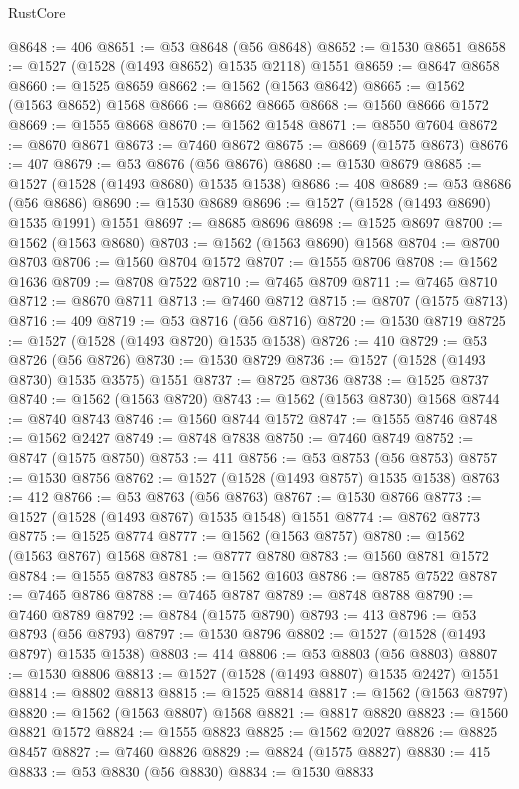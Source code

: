\begin{lexlean}{RustCore}
\begin{coremodule}
@8648 := 406
@8651 := @53 @8648 (@56 @8648)
@8652 := @1530 @8651
@8658 := @1527 (@1528 (@1493 @8652) @1535 @2118) @1551
@8659 := @8647 @8658
@8660 := @1525 @8659
@8662 := @1562 (@1563 @8642)
@8665 := @1562 (@1563 @8652) @1568
@8666 := @8662 @8665
@8668 := @1560 @8666 @1572
@8669 := @1555 @8668
@8670 := @1562 @1548
@8671 := @8550 @7604
@8672 := @8670 @8671
@8673 := @7460 @8672
@8675 := @8669 (@1575 @8673)
@8676 := 407
@8679 := @53 @8676 (@56 @8676)
@8680 := @1530 @8679
@8685 := @1527 (@1528 (@1493 @8680) @1535 @1538)
@8686 := 408
@8689 := @53 @8686 (@56 @8686)
@8690 := @1530 @8689
@8696 := @1527 (@1528 (@1493 @8690) @1535 @1991) @1551
@8697 := @8685 @8696
@8698 := @1525 @8697
@8700 := @1562 (@1563 @8680)
@8703 := @1562 (@1563 @8690) @1568
@8704 := @8700 @8703
@8706 := @1560 @8704 @1572
@8707 := @1555 @8706
@8708 := @1562 @1636
@8709 := @8708 @7522
@8710 := @7465 @8709
@8711 := @7465 @8710
@8712 := @8670 @8711
@8713 := @7460 @8712
@8715 := @8707 (@1575 @8713)
@8716 := 409
@8719 := @53 @8716 (@56 @8716)
@8720 := @1530 @8719
@8725 := @1527 (@1528 (@1493 @8720) @1535 @1538)
@8726 := 410
@8729 := @53 @8726 (@56 @8726)
@8730 := @1530 @8729
@8736 := @1527 (@1528 (@1493 @8730) @1535 @3575) @1551
@8737 := @8725 @8736
@8738 := @1525 @8737
@8740 := @1562 (@1563 @8720)
@8743 := @1562 (@1563 @8730) @1568
@8744 := @8740 @8743
@8746 := @1560 @8744 @1572
@8747 := @1555 @8746
@8748 := @1562 @2427
@8749 := @8748 @7838
@8750 := @7460 @8749
@8752 := @8747 (@1575 @8750)
@8753 := 411
@8756 := @53 @8753 (@56 @8753)
@8757 := @1530 @8756
@8762 := @1527 (@1528 (@1493 @8757) @1535 @1538)
@8763 := 412
@8766 := @53 @8763 (@56 @8763)
@8767 := @1530 @8766
@8773 := @1527 (@1528 (@1493 @8767) @1535 @1548) @1551
@8774 := @8762 @8773
@8775 := @1525 @8774
@8777 := @1562 (@1563 @8757)
@8780 := @1562 (@1563 @8767) @1568
@8781 := @8777 @8780
@8783 := @1560 @8781 @1572
@8784 := @1555 @8783
@8785 := @1562 @1603
@8786 := @8785 @7522
@8787 := @7465 @8786
@8788 := @7465 @8787
@8789 := @8748 @8788
@8790 := @7460 @8789
@8792 := @8784 (@1575 @8790)
@8793 := 413
@8796 := @53 @8793 (@56 @8793)
@8797 := @1530 @8796
@8802 := @1527 (@1528 (@1493 @8797) @1535 @1538)
@8803 := 414
@8806 := @53 @8803 (@56 @8803)
@8807 := @1530 @8806
@8813 := @1527 (@1528 (@1493 @8807) @1535 @2427) @1551
@8814 := @8802 @8813
@8815 := @1525 @8814
@8817 := @1562 (@1563 @8797)
@8820 := @1562 (@1563 @8807) @1568
@8821 := @8817 @8820
@8823 := @1560 @8821 @1572
@8824 := @1555 @8823
@8825 := @1562 @2027
@8826 := @8825 @8457
@8827 := @7460 @8826
@8829 := @8824 (@1575 @8827)
@8830 := 415
@8833 := @53 @8830 (@56 @8830)
@8834 := @1530 @8833

\end{coremodule}
\end{lexlean}
